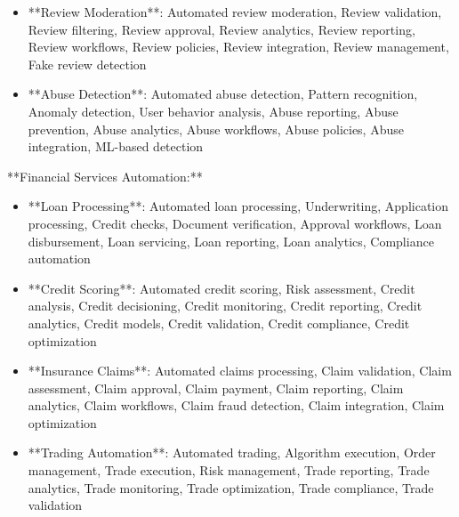 \documentclass[11pt,a4paper]{article}
\begin{document}
\begin{itemize}
\item **Review Moderation**: Automated review moderation, Review validation, Review filtering, Review approval, Review analytics, Review reporting, Review workflows, Review policies, Review integration, Review management, Fake review detection
\end{itemize}

\begin{itemize}
\item **Abuse Detection**: Automated abuse detection, Pattern recognition, Anomaly detection, User behavior analysis, Abuse reporting, Abuse prevention, Abuse analytics, Abuse workflows, Abuse policies, Abuse integration, ML-based detection
\end{itemize}

**Financial Services Automation:**

\begin{itemize}
\item **Loan Processing**: Automated loan processing, Underwriting, Application processing, Credit checks, Document verification, Approval workflows, Loan disbursement, Loan servicing, Loan reporting, Loan analytics, Compliance automation
\end{itemize}

\begin{itemize}
\item **Credit Scoring**: Automated credit scoring, Risk assessment, Credit analysis, Credit decisioning, Credit monitoring, Credit reporting, Credit analytics, Credit models, Credit validation, Credit compliance, Credit optimization
\end{itemize}

\begin{itemize}
\item **Insurance Claims**: Automated claims processing, Claim validation, Claim assessment, Claim approval, Claim payment, Claim reporting, Claim analytics, Claim workflows, Claim fraud detection, Claim integration, Claim optimization
\end{itemize}

\begin{itemize}
\item **Trading Automation**: Automated trading, Algorithm execution, Order management, Trade execution, Risk management, Trade reporting, Trade analytics, Trade monitoring, Trade optimization, Trade compliance, Trade validation
\end{itemize}
\end{document}
